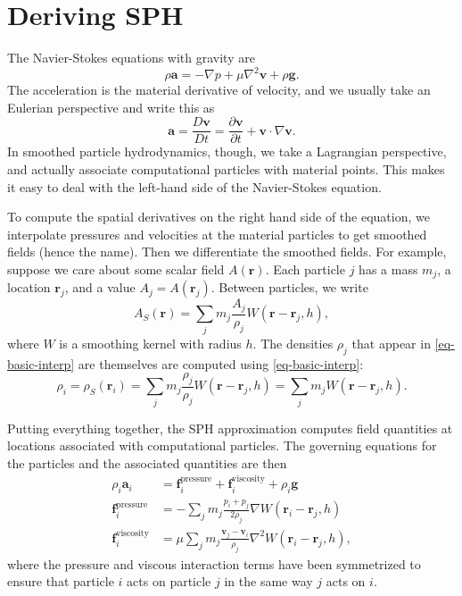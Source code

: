 \documentclass[10pt, leqno]{article} %
\newcommand{\bfr}{\mathbf{r}}
\newcommand{\bfv}{\mathbf{v}}
\newcommand{\bfa}{\mathbf{a}}
\newcommand{\bff}{\mathbf{f}}
\newcommand{\bfg}{\mathbf{g}}
\begin{document}
\pagestyle{fancy}
\fancyfoot{}

\section{Deriving SPH}

The Navier-Stokes equations with gravity are
\[
  \rho \bfa = -\nabla p + \mu \nabla^2 \bfv + \rho \bfg.
\]
The acceleration is the material derivative of velocity, and we
usually take an Eulerian perspective and write this as
\[
  \bfa 
  = \frac{D\bfv}{Dt}
  = \frac{\partial \bfv}{\partial t} + \bfv \cdot \nabla \bfv.
\]
In smoothed particle hydrodynamics, though, we take a Lagrangian
perspective, and actually associate computational particles with
material points.  This makes it easy to deal with the left-hand side
of the Navier-Stokes equation.

To compute the spatial derivatives on the right hand side of the
equation, we interpolate pressures and velocities at the material
particles to get smoothed fields (hence the name).  Then we
differentiate the smoothed fields.
For example, suppose we care about some scalar field $A(\bfr)$.
Each particle $j$ has a mass $m_j$, a location $\bfr_j$, and
a value $A_j = A(\bfr_j)$.  Between particles, we write
\begin{equation} \label{eq-basic-interp}
  A_S(\bfr) = \sum_{j} m_j \frac{A_j}{\rho_j} W(\bfr - \bfr_j, h),
\end{equation}
where $W$ is a smoothing kernel with radius $h$.  The densities
$\rho_j$ that appear in \eqref{eq-basic-interp} are themselves are 
computed using \eqref{eq-basic-interp}:
\[
  \rho_i 
  = \rho_S(\bfr_i) 
  = \sum_{j} m_j \frac{\rho_j}{\rho_j} W(\bfr - \bfr_j, h)
  = \sum_{j} m_j W(\bfr - \bfr_j, h).
\]

Putting everything together, the SPH approximation computes field
quantities at locations associated with computational particles.
The governing equations for the particles and the associated quantities
are then
\begin{align}
  \rho_i \bfa_i &= 
    \bff_i^{\mathrm{pressure}} + 
    \bff_i^{\mathrm{viscosity}} + \rho_i \bfg 
    \label{eq-particle-evolve} \\
  \bff_i^{\mathrm{pressure}}  &= 
    -\sum_j m_j \frac{p_i+p_j}{2 \rho_j} \nabla W(\bfr_i-\bfr_j, h) 
    \label{eq-pressure-force} \\
  \bff_i^{\mathrm{viscosity}} &=
    \mu \sum_j m_j \frac{\bfv_j-\bfv_i}{\rho_j} \nabla^2 W(\bfr_i-\bfr_j, h),
    \label{eq-viscous-force}
\end{align}
where the pressure and viscous interaction terms have been symmetrized to
ensure that particle $i$ acts on particle $j$ in the same way $j$ acts on $i$.
\end{document}
